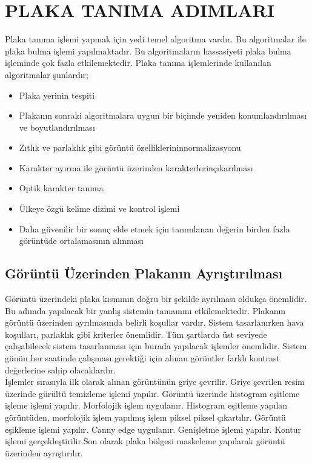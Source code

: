 \section{PLAKA TANIMA ADIMLARI}
\cite{plate}Plaka tanıma işlemi yapmak için yedi temel algoritma vardır. Bu algoritmalar ile plaka bulma işlemi yapılmaktadır. Bu algoritmaların hassasiyeti plaka bulma işleminde çok fazla etkilemektedir.\cite{plakatanımlama} Plaka tanıma işlemlerinde kullanılan algoritmalar şunlardır;
\begin{itemize}
\item Plaka yerinin tespiti
\item Plakanın sonraki algoritmalara uygun bir biçimde yeniden konumlandırılması ve boyutlandırılması
\item Zıtlık ve parlaklık gibi görüntü özelliklerininnormalizasyonu
\item Karakter ayırma ile görüntü üzerinden karakterlerinçıkarılması
\item Optik karakter tanıma
\item Ülkeye özgü kelime dizimi ve kontrol işlemi
\item Daha güvenilir bir sonuç elde etmek için tanımlanan değerin birden fazla görüntüde ortalamasının alınması
\end{itemize}
\subsection{Görüntü Üzerinden Plakanın Ayrıştırılması}
\cite{platereg} Görüntü üzerindeki plaka kısmının doğru bir şekilde ayrılması oldukça önemlidir. Bu adımda yapılacak bir yanlış sistemin tamamını etkilemektedir. Plakanın görüntü üzerinden ayrılmasında belirli koşullar vardır. Sistem tasarlanırken hava koşulları, parlaklık gibi kriterler önemlidir. Tüm şartlarda üst seviyede çalışabilecek sistem tasarlanması için burada yapılacak işlemler önemlidir. Sistem günün her saatinde çalışması gerektiği için alınan görüntler farklı kontrast değerlerine sahip olacaklardır. \\
\cite{video_proc} İşlemler sırasıyla ilk olarak alınan görüntünün griye çevrilir. Griye çevrilen resim üzerinde gürültü temizleme işlemi yapılır. Görüntü üzerinde histogram eşitleme işleme işlemi yapılır. Morfolojik işlem uygulanır. Histogram eşitleme yapılan görüntüden, morfolojik işlem yapılmış işlem piksel piksel çıkartılır. Görüntü eşikleme işlemi yapılır. Canny edge uygulanır. Genişletme işlemi yapılır. Kontur işlemi gerçekleştirilir.Son olarak plaka bölgesi maskeleme yapılarak görüntü üzerinden ayrıştırılır.
